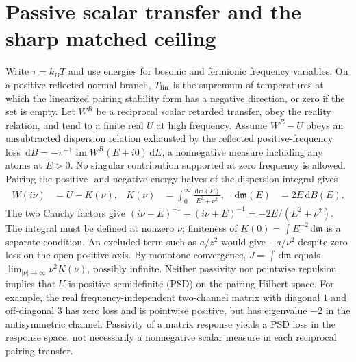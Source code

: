 \documentclass[11pt]{article}
\newcommand{\dd}{\,\mathrm{d}}
\newcommand{\Tlin}{T_{\rm lin}}
\begin{document}
\section{Passive scalar transfer and the sharp matched ceiling}
Write $\tau=k_BT$ and use energies for bosonic and fermionic frequency variables. On a positive reflected normal branch, $\Tlin$ is the supremum of temperatures at which the linearized pairing stability form has a negative direction, or zero if the set is empty. Let $W^R$ be a reciprocal scalar retarded transfer, obey the reality relation, and tend to a finite real $U$ at high frequency. Assume $W^R-U$ obeys an unsubtracted dispersion relation exhausted by the reflected positive-frequency loss $\dd B=-\pi^{-1}\operatorname{Im}W^R(E+i0)\dd E$, a nonnegative measure including any atoms at $E>0$. No singular contribution supported at zero frequency is allowed. Pairing the positive- and negative-energy halves of the dispersion integral gives
\begin{align}
 W(i\nu)&=U-K(\nu), & K(\nu)&=\int_0^\infty\frac{\dd\mathfrak m(E)}{E^2+\nu^2}, & \dd\mathfrak m(E)&=2E\dd B(E).
\end{align}
The two Cauchy factors give $(i\nu-E)^{-1}-(i\nu+E)^{-1}=-2E/(E^2+\nu^2)$. The integral must be defined at nonzero $\nu$; finiteness of $K(0)=\int E^{-2}\dd\mathfrak m$ is a separate condition. An excluded term such as $a/z^2$ would give $-a/\nu^2$ despite zero loss on the open positive axis. By monotone convergence, $J=\int\dd\mathfrak m$ equals $\lim_{|\nu|\to\infty}\nu^2K(\nu)$, possibly infinite. Neither passivity nor pointwise repulsion implies that $U$ is positive semidefinite (PSD) on the pairing Hilbert space. For example, the real frequency-independent two-channel matrix with diagonal $1$ and off-diagonal $3$ has zero loss and is pointwise positive, but has eigenvalue $-2$ in the antisymmetric channel. Passivity of a matrix response yields a PSD loss in the response space, not necessarily a nonnegative scalar measure in each reciprocal pairing transfer.
\end{document}

